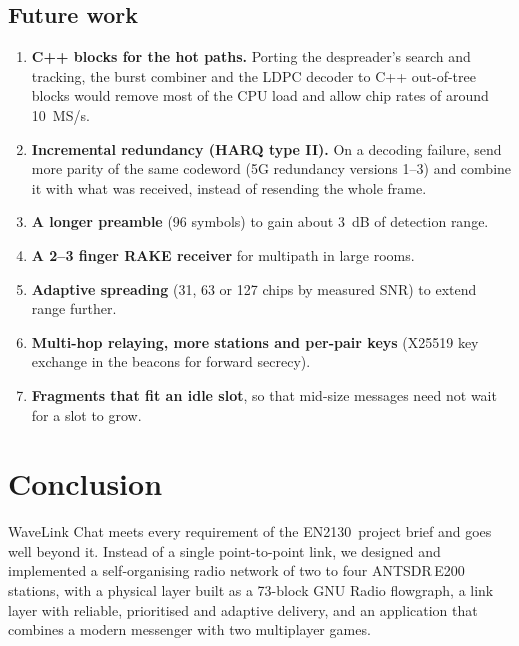 \documentclass[11pt,a4paper,oneside]{report}
\newcommand{\CourseCode}{EN2130}
\begin{document}
\section{Future work}
\begin{enumerate}
  \item \textbf{C++ blocks for the hot paths.} Porting the despreader's search and tracking, the burst
        combiner and the LDPC decoder to C++ out-of-tree blocks would remove most of the CPU load and
        allow chip rates of around \SI{10}{MS/s}.
  \item \textbf{Incremental redundancy (HARQ type II).} On a decoding failure, send more parity of the same
        codeword (5G redundancy versions 1--3) and combine it with what was received, instead of resending
        the whole frame.
  \item \textbf{A longer preamble} (96 symbols) to gain about \SI{3}{dB} of detection range.
  \item \textbf{A 2--3 finger RAKE receiver} for multipath in large rooms.
  \item \textbf{Adaptive spreading} (31, 63 or 127 chips by measured SNR) to extend range further.
  \item \textbf{Multi-hop relaying, more stations and per-pair keys} (X25519 key exchange in the
        beacons for forward secrecy).
  \item \textbf{Fragments that fit an idle slot}, so that mid-size messages need not wait for a slot to grow.
\end{enumerate}

\chapter{Conclusion}\label{ch:conclusion}
WaveLink Chat meets every requirement of the \CourseCode\ project brief and goes well beyond it. Instead of
a single point-to-point link, we designed and implemented a self-organising radio network of two to
four ANTSDR\,E200 stations, with a physical layer built as a 73-block GNU Radio flowgraph, a link layer
with reliable, prioritised and adaptive delivery, and an application that combines a modern messenger
with two multiplayer games.
\end{document}
